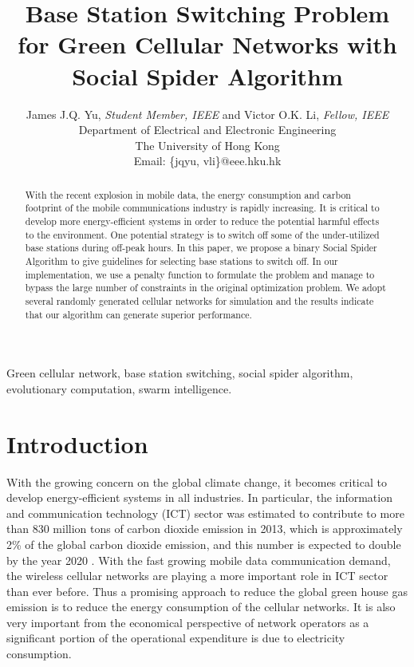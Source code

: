 \documentclass[conference]{IEEEtran}
\begin{document}
\title{Base Station Switching Problem for Green Cellular Networks with Social Spider Algorithm}

\author{James J.Q. Yu,
       \textit{Student Member, IEEE} and
       Victor O.K. Li,
       \textit{Fellow, IEEE}\\
       Department of Electrical and Electronic Engineering\\
       The University of Hong Kong\\
       Email: \{jqyu, vli\}@eee.hku.hk}
       
\maketitle
\pagestyle{empty}

\begin{abstract}
With the recent explosion in mobile data, the energy consumption and carbon footprint of the mobile communications industry is rapidly increasing. It is critical to develop more energy-efficient systems in order to reduce the potential harmful effects to the environment. One potential strategy is to switch off some of the under-utilized base stations during off-peak hours. In this paper, we propose a binary Social Spider Algorithm to give guidelines for selecting base stations to switch off. In our implementation, we use a penalty function to formulate the problem and manage to bypass the large number of constraints in the original optimization problem. We adopt several randomly generated cellular networks for simulation and the results indicate that our algorithm can generate superior performance.
\end{abstract}

\begin{IEEEkeywords}
Green cellular network, base station switching, social spider algorithm, evolutionary computation, swarm intelligence.
\end{IEEEkeywords}

\section{Introduction}
With the growing concern on the global climate change, it becomes critical to develop energy-efficient systems in all industries. In particular, the information and communication technology (ICT) sector was estimated to contribute to more than 830 million tons of carbon dioxide emission in 2013, which is approximately 2\% of the global carbon dioxide emission, and this number is expected to double by the year 2020 \cite{2013CEETAnnualReport}. With the fast growing mobile data communication demand, the wireless cellular networks are playing a more important role in ICT sector than ever before. Thus a promising approach to reduce the global green house gas emission is to reduce the energy consumption of the cellular networks. It is also very important from the economical perspective of network operators as a significant portion of the operational expenditure is due to electricity consumption.
\end{document}
